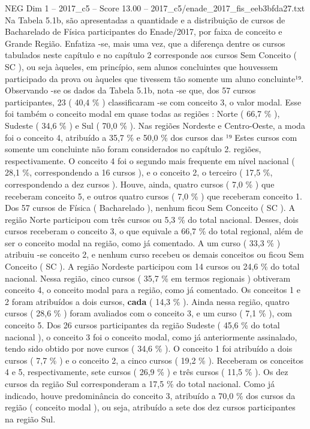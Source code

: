 \begin{textsample}{NEG Dim 1 – 2017\_c5 – Score 13.00 – 2017\_c5/enade\_2017\_fis\_eeb3bfda27.txt}
Na Tabela 5.1b, são apresentadas a quantidade e a distribuição de cursos de Bacharelado de Física participantes do Enade/2017, por faixa de conceito e Grande Região.
Enfatiza -se, mais uma vez, que a diferença dentre os cursos tabulados neste capítulo e no capítulo 2 corresponde aos cursos Sem Conceito ( SC ), ou seja àqueles, em princípio, sem alunos concluintes que houvessem participado da prova ou àqueles que tivessem tão somente um aluno concluinte¹⁹.
Observando -se os dados da Tabela 5.1b, nota -se que, dos 57 cursos participantes, 23 ( 40,4 \% ) classificaram -se com conceito 3, o valor modal.
Esse foi também o conceito modal em quase todas as regiões : Norte ( 66,7 \% ), Sudeste ( 34,6 \% ) e Sul ( 70,0 \% ).
Nas regiões Nordeste e Centro-Oeste, a moda foi o conceito 4, atribuído a 35,7 \% e 50,0 \% dos cursos das ¹⁹ Estes cursos com somente um concluinte não foram considerados no capítulo 2. regiões, respectivamente.
O conceito 4 foi o segundo mais frequente em nível nacional ( 28,1 \%, correspondendo a 16 cursos ), e o conceito 2, o terceiro ( 17,5 \%, correspondendo a dez cursos ).
Houve, ainda, quatro cursos ( 7,0 \% ) que receberam conceito 5, e outros quatro cursos ( 7,0 \% ) que receberam conceito 1.
Dos 57 cursos de Física ( Bacharelado ), nenhum ficou Sem Conceito ( SC ).
A região Norte participou com três cursos ou 5,3 \% do total nacional.
Desses, dois cursos receberam o conceito 3, o que equivale a 66,7 \% do total regional, além de ser o conceito modal na região, como já comentado.
A um curso ( 33,3 \% ) atribuiu -se conceito 2, e nenhum curso recebeu os demais conceitos ou ficou Sem Conceito ( SC ).
A região Nordeste participou com 14 cursos ou 24,6 \% do total nacional.
Nessa região, cinco cursos ( 35,7 \% em termos regionais ) obtiveram conceito 4, o conceito modal para a região, como já comentado.
Os conceitos 1 e 2 foram atribuídos a dois cursos, \textbf{cada} ( 14,3 \% ).
Ainda nessa região, quatro cursos ( 28,6 \% ) foram avaliados com o conceito 3, e um curso ( 7,1 \% ), com conceito 5.
Dos 26 cursos participantes da região Sudeste ( 45,6 \% do total nacional ), o conceito 3 foi o conceito modal, como já anteriormente assinalado, tendo sido obtido por nove cursos ( 34,6 \% ).
O conceito 1 foi atribuído a dois cursos ( 7,7 \% ) e o conceito 2, a cinco cursos ( 19,2 \% ).
Receberam os conceitos 4 e 5, respectivamente, sete cursos ( 26,9 \% ) e três cursos ( 11,5 \% ).
Os dez cursos da região Sul corresponderam a 17,5 \% do total nacional.
Como já indicado, houve predominância do conceito 3, atribuído a 70,0 \% dos cursos da região ( conceito modal ), ou seja, atribuído a sete dos dez cursos participantes na região Sul.

\end{textsample}

